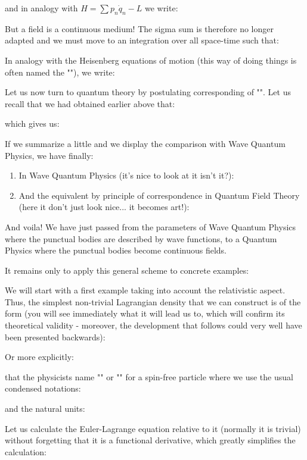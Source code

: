 	and in analogy with $H=\sum p_n\dot{q}_n-L$ we write:
	
	But a field is a continuous medium! The sigma sum  is therefore no longer adapted and we must move to an integration over all space-time such that:
	
	In analogy with the Heisenberg equations of motion (this way of doing things is often named the ""), we write:
	
	Let us now turn to quantum theory by postulating corresponding of "". Let us recall that we had obtained earlier above that:
	
	which gives us:
	
	If we summarize a little and we display the comparison with Wave Quantum Physics, we have finally:
	\begin{enumerate}
		\item In Wave Quantum Physics (it's nice to look at it isn't it?):
		
		
		\item And the equivalent by principle of correspondence in Quantum Field Theory (here it don't just look nice... it becomes art!):
		
	\end{enumerate}
	And voila! We have just passed from the parameters of Wave Quantum Physics where the punctual bodies are described by wave functions, to a Quantum Physics where the punctual bodies become continuous fields.

	It remains only to apply this general scheme to concrete examples:

	We will start with a first example taking into account the relativistic aspect. Thus, the simplest non-trivial Lagrangian density that we can construct is of the form (you will see immediately what it will lead us to, which will confirm its theoretical validity - moreover, the development that follows could very well have been presented backwards):
	
	Or more explicitly:
	
	that the physicists name "" or "" for a spin-free particle where we use the usual condensed notations:
	
	and the natural units:
	
	Let us calculate the Euler-Lagrange equation relative to it (normally it is trivial) without forgetting that it is a functional derivative, which greatly simplifies the calculation:
	
